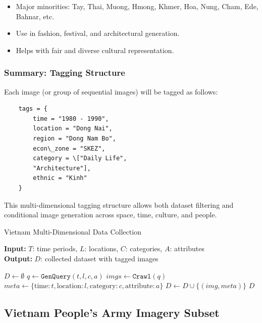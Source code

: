 \documentclass[conference]{IEEEtran}
\begin{document}
\begin{itemize}
	\item Major minorities: Tay, Thai, Muong, Hmong, Khmer, Hoa, Nung, Cham, Ede, Bahnar, etc.
	\item Use in fashion, festival, and architectural generation.
	\item Helps with fair and diverse cultural representation.
\end{itemize}

\subsubsection{Summary: Tagging Structure}

Each image (or group of sequential images) will be tagged as follows:

\begin{verbatim}
	tags = {
		time = "1980 - 1990",
		location = "Dong Nai",
		region = "Dong Nam Bo",
		econ\_zone = "SKEZ",
		category = \["Daily Life", 
		"Architecture"],
		ethnic = "Kinh"
	}
\end{verbatim}

This multi-dimensional tagging structure allows both dataset filtering and conditional image generation across space, time, culture, and people.

\begin{algorithm}
	\caption{Vietnam Multi-Dimensional Data Collection}
	\label{alg:collect_data}
	\textbf{Input:} $T$: time periods, $L$: locations, $C$: categories, $A$: attributes \\
	\textbf{Output:} $D$: collected dataset with tagged images
	
	\begin{algorithmic}[1]
		\State $D \gets \emptyset$
		\State $q \gets \texttt{GenQuery}(t, l, c, a)$ 
		\State $imgs \gets \texttt{Crawl}(q)$ 
		\State $meta \gets \{ \text{time}: t, \text{location}: l, \text{category}: c, \text{attribute}: a \}$
		\State $D \gets D \cup \{ (img, meta) \}$
		\EndIf
		\EndFor
		\EndFor
		\EndFor
		\EndFor
		\EndFor
		\State \Return $D$
	\end{algorithmic}
\end{algorithm}

\subsection{Vietnam People's Army Imagery Subset}
\end{document}
